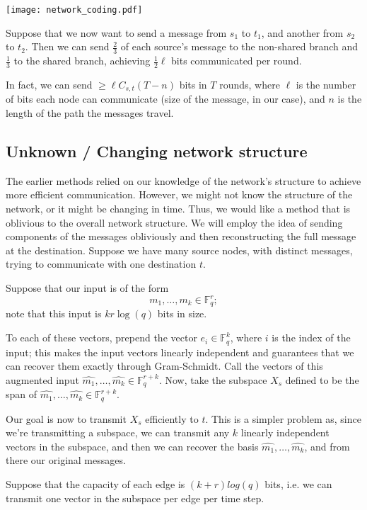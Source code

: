 \documentclass[11pt]{article}
\newcommand{\F}{\mathbb{F}}
\begin{document}
\begin{center}
\texttt{[image: network\_coding.pdf]}
\end{center}

Suppose that we now want to send a message from $s_1$ to $t_1$, and another from $s_2$ to $t_2$. Then we can send $\frac{2}{3}$ of each source's message to the non-shared branch and $\frac{1}{3}$ to the shared branch, achieving $\frac{1}{2}\ell$ bits communicated per round.

In fact, we can send $\geq \ell C_{s,t} (T - n)$ bits in $T$ rounds, where $\ell$ is the number of bits each node can communicate (size of the message, in our case), and $n$ is the length of the path the messages travel.

\subsection{Unknown / Changing network structure}

The earlier methods relied on our knowledge of the network's structure to achieve more efficient communication. However, we might not know the structure of the network, or it might be changing in time.  Thus, we would like a method that is oblivious to the overall network structure. We will employ the idea of sending components of the messages obliviously and then reconstructing the full message at the destination.  Suppose we have many source nodes, with distinct messages, trying to communicate with one destination $t$.

Suppose that our input is of the form
$$
m_1, \ldots, m_k \in \F_q^r;
$$
note that this input is $kr\log(q)$ bits in size.

To each of these vectors, prepend the vector $e_i \in \F_q^k$, where $i$ is the index of the input; this makes the input vectors linearly independent and guarantees that we can recover them exactly through Gram-Schmidt. Call the vectors of this augmented input $\hat{m_1}, \ldots, \hat{m_k} \in \F_q^{r+k}$.  Now, take the subspace $X_s$ defined to be the span of $\hat{m_1}, \ldots, \hat{m_k} \in \F_q^{r+k}$.

Our goal is now to transmit $X_s$ efficiently to $t$. This is a simpler problem as, since we're transmitting a subspace, we can transmit any $k$ linearly independent vectors in the subspace, and then we can recover the basis $\hat{m_1}, \ldots, \hat{m_k}$, and from there our original messages.

Suppose that the capacity of each edge is $(k+r)log(q)$ bits, i.e. we can transmit one vector in the subspace per edge per time step.
\end{document}
